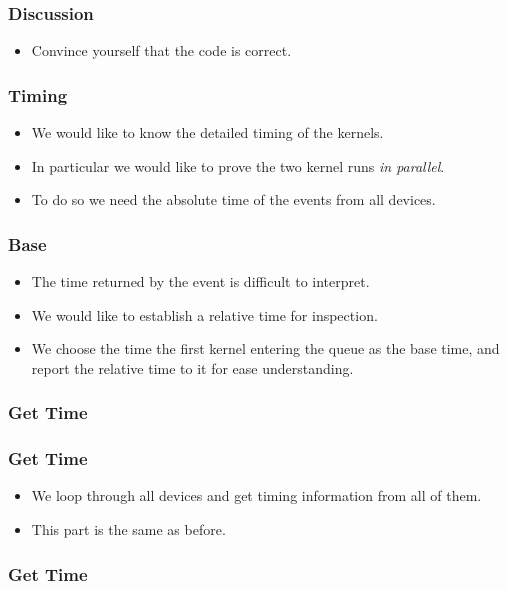 \documentclass{beamer}
\begin{document}
\begin{frame}
  \frametitle{Discussion}
  \begin{itemize}
    \item Convince yourself that the code is correct.
  \end{itemize}
\end{frame}

\begin{frame}
  \frametitle{Timing}
  \begin{itemize}
    \item We would like to know the detailed timing of the kernels.
    \item In particular we would like to prove the two kernel runs {\em in
      parallel}.
    \item To do so we need the absolute time of the events from all devices.
  \end{itemize}
\end{frame}

\begin{frame}
  \frametitle{Base}
  \begin{itemize}
    \item The time returned by the event is difficult to interpret.
    \item We would like to establish a relative time for inspection.
      \item We choose the time the first kernel entering the queue as
        the base time, and report the relative time to it for ease
        understanding.
  \end{itemize}
\end{frame}

\begin{frame}
  \frametitle{Get Time}
\end{frame}

\begin{frame}
  \frametitle{Get Time}
  \begin{itemize}
    \item We loop through all devices and get timing information from
      all of them.
    \item This part is the same as before.
  \end{itemize}
\end{frame}

\begin{frame}
  \frametitle{Get Time}
\end{frame}
\end{document}
